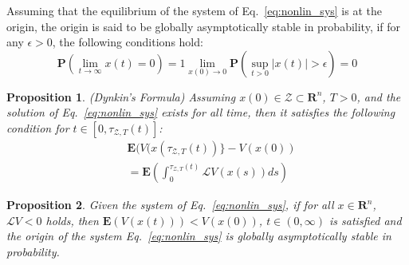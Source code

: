 \documentclass[letterpaper, 10pt, conference]{ieeeconf}
\newtheorem{prop}{Proposition}
\begin{document}
	\begin{definition} \cite{khasminskii2011stochastic}
		Assuming that the equilibrium of the system of Eq.~\ref{eq:nonlin_sys} is at the origin, the origin is said to be globally asymptotically stable in probability, if for any $\epsilon > 0$, the following conditions hold:
		\begin{subequations}
			\label{eq:stochastic_stable}
			\begin{equation}\label{eq:stochastic_stable1}
			\mathbf{P}(\lim_{t \to \infty} x(t)=0)=1
			\end{equation}
			\begin{equation}\label{eq:stochastic_stable2}
			\lim \limits_{x(0) \rightarrow 0} \mathbf{P}(\sup_{t > 0} \vert x(t) \vert > \epsilon)=0
			\end{equation}
		\end{subequations}
	\end{definition}
	
	\vspace{0.3cm}
	
	\begin{prop} (Dynkin's Formula) \cite{pinsky1987stochastic}
		Assuming $x(0) \in \mathcal{Z} \subset \mathbf{R}^n$, $T>0$, and the solution of Eq.~\ref{eq:nonlin_sys} exists for all time, then it satisfies the following condition for $t \in [0,\tau_{\mathcal{Z}, T}(t)]$:
		\begin{equation}\label{dynkin}
		\begin{split}
		&\mathbf{E}(V(x(\tau_{\mathcal{Z}, T}(t))\}-V(x(0))\\
		&=\mathbf{E}(\int_{0}^{\tau_{\mathcal{Z}, T}(t)} \mathcal{L}V(x(s))ds)
		\end{split}
		\end{equation}	
	\end{prop}
	
		\vspace{0.3cm}
	
	\begin{prop}\cite{khasminskii2011stochastic}
		Given the system of Eq.~\ref{eq:nonlin_sys}, if for all $x \in \mathbf{R}^n$, $\mathcal{L}V <0$ holds, then $\mathbf{E}(V(x(t))) < V(x(0))$, $ t \in (0, \infty)$ is satisfied and the origin of the system Eq.~\ref{eq:nonlin_sys} is globally asymptotically stable in probability.
	\end{prop}

	
\end{document}
